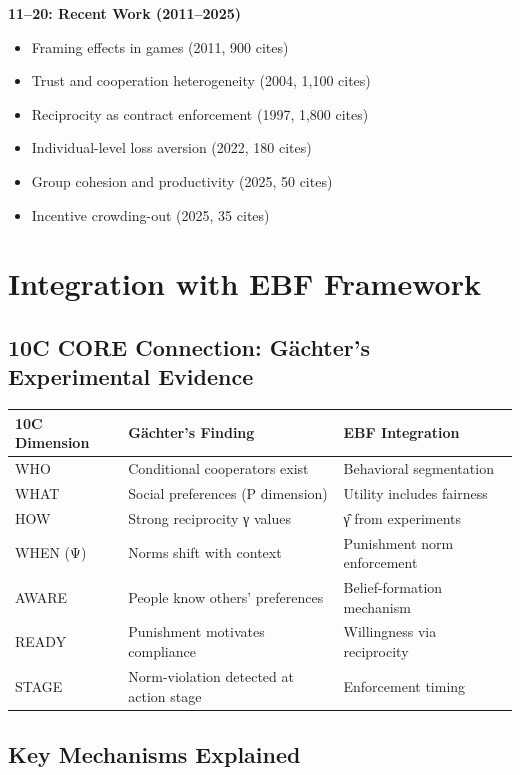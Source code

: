 \documentclass[11pt]{article}
\begin{document}
\textbf{11–20: Recent Work (2011–2025)}
\begin{itemize}
    \item Framing effects in games (2011, 900 cites)
    \item Trust and cooperation heterogeneity (2004, 1,100 cites)
    \item Reciprocity as contract enforcement (1997, 1,800 cites)
    \item Individual-level loss aversion (2022, 180 cites)
    \item Group cohesion and productivity (2025, 50 cites)
    \item Incentive crowding-out (2025, 35 cites)
\end{itemize}

\section*{Integration with EBF Framework}

\subsection*{10C CORE Connection: Gächter's Experimental Evidence}

\begin{tabular}{|l|l|l|}
\hline
\textbf{10C Dimension} & \textbf{Gächter's Finding} & \textbf{EBF Integration} \\
\hline
WHO & Conditional cooperators exist & Behavioral segmentation \\
\hline
WHAT & Social preferences (P dimension) & Utility includes fairness \\
\hline
HOW & Strong reciprocity γ values & γ̂ from experiments \\
\hline
WHEN (Ψ) & Norms shift with context & Punishment norm enforcement \\
\hline
AWARE & People know others' preferences & Belief-formation mechanism \\
\hline
READY & Punishment motivates compliance & Willingness via reciprocity \\
\hline
STAGE & Norm-violation detected at action stage & Enforcement timing \\
\hline
\end{tabular}

\subsection*{Key Mechanisms Explained}
\end{document}
